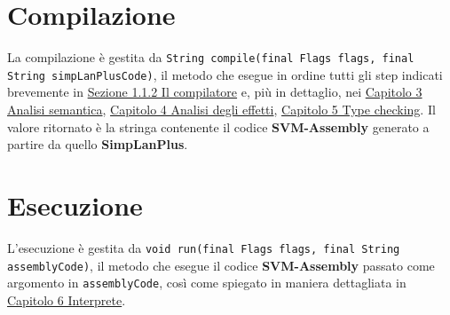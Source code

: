 \documentclass[../report.tex]{subfiles}
\begin{document}
\section{Compilazione}\label{s:compilazione}
La compilazione è gestita da \verb|String compile(final Flags flags, final String simpLanPlusCode)|, il metodo che esegue in ordine tutti gli step indicati brevemente in \hyperref[ss:compilatore]{Sezione 1.1.2 Il compilatore} e, più in dettaglio, nei \hyperref[c:analisi-semantica]{Capitolo 3 Analisi semantica}, \hyperref[c:analisi-effetti]{Capitolo 4 Analisi degli effetti}, \hyperref[c:typechecking]{Capitolo 5 Type checking}.
Il valore ritornato è la stringa contenente il codice \textbf{SVM-Assembly} generato a partire da quello \textbf{SimpLanPlus}.

\section{Esecuzione}\label{s:esecuzione}
L'esecuzione è gestita da \verb|void run(final Flags flags, final String assemblyCode)|, il metodo che esegue il codice \textbf{SVM-Assembly} passato come argomento in \verb|assemblyCode|, così come spiegato in maniera dettagliata in \hyperref[c:interprete]{Capitolo 6 Interprete}.
\end{document}
